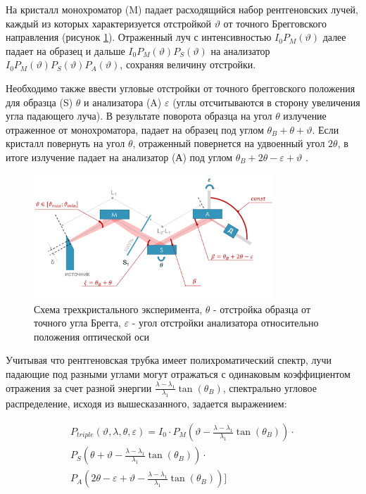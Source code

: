 На кристалл монохроматор (M) падает расходящийся набор рентгеновских лучей, каждый из которых характеризуется отстройкой
$\vartheta$ от точного Брегговского направления (рисунок \ref{ris:triple_crystal_schem}). Отраженный луч с интенсивностью
$I_0 P_M(\vartheta)$ далее падает на образец и дальше $I_0 P_M(\vartheta)P_S(\vartheta)$  на анализатор $I_0 P_M(\vartheta)P_S(\vartheta)P_A(\vartheta)$,
сохраняя величину отстройки.

Необходимо также ввести угловые отстройки от точного брегговского положения
для образца (S) $\theta$ и анализатора (A) $\varepsilon$  (углы отсчитываются в сторону увеличения угла падающего луча).
В результате поворота образца на угол  $\theta$ излучение отраженное от монохроматора, падает на образец
под углом $\theta_B+\theta+\vartheta$. Если кристалл повернуть на угол $\theta$, отраженный повернется на удвоенный угол
$2\theta$, в итоге излучение падает на анализатор (А) под углом $\theta_B+2\theta-\varepsilon+\vartheta$ \cite{trd_Bushuev_1997}.
\begin{figure}[H]
  \centering
  \includegraphics[width=0.8\textwidth]{images/triple_crystal_schem.png}
  \caption{Схема трехкристального эксперимента, $\theta$ - отстройка образца от точного угла Брегга,
  $\varepsilon$ - угол отстройки анализатора относительно положения оптической оси}
  \label{ris:triple_crystal_schem}
\end{figure}

Учитывая что рентгеновская трубка имеет полихроматический спектр, лучи падающие под разными углами могут отражаться
с одинаковым коэффициентом отражения за счет разной энергии $\frac{\lambda - \lambda_1}{\lambda_1}\tan(\theta_B)$,
спектрально угловое распределение, исходя из вышесказанного, задается выражением:

\begin{eqnarray} \label{eq:triplr_spectra_angle_map}
  P_{triple}(\vartheta,\lambda,\theta,\varepsilon) =I_0\cdot
    P_M \left(\vartheta - \frac{\lambda - \lambda_1}{\lambda_1}\tan(\theta_B) \right) \cdot \nonumber \\
   P_S \left(\theta + \vartheta - \frac{\lambda - \lambda_1}{\lambda_1}\tan(\theta_B)\right)  \cdot  \nonumber \\
   P_A \left(2\theta - \varepsilon + \vartheta - \frac{\lambda - \lambda_1}{\lambda_1}\tan(\theta_B)\right) \Bigg]
 \end{eqnarray}

